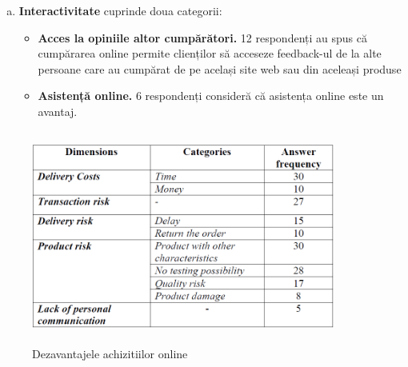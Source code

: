 \documentclass[a4paper, 12pt]{article}
\begin{document}
\begin{enumerate}[a.]
\begin{itemize}
	\end{itemize}
	\item\textbf{Interactivitate} cuprinde doua categorii:
	\begin{itemize}
		\item\textbf {Acces la opiniile altor cumpărători.} 12 respondenți au spus că cumpărarea online permite clienților să acceseze feedback-ul de la alte persoane care au cumpărat de pe același site web sau din aceleași produse
		\item\textbf{Asistență online.} 6 respondenți consideră că asistența online este un avantaj.
	\end{itemize}
	\end{enumerate}
		\begin{figure}[!htb]
		\centering
		\includegraphics[width=10cm, height=7cm]{"figures/noua.png"}
		\caption{Dezavantajele achizitiilor online}\label{fig:zece}
	\end{figure}
\end{document}
